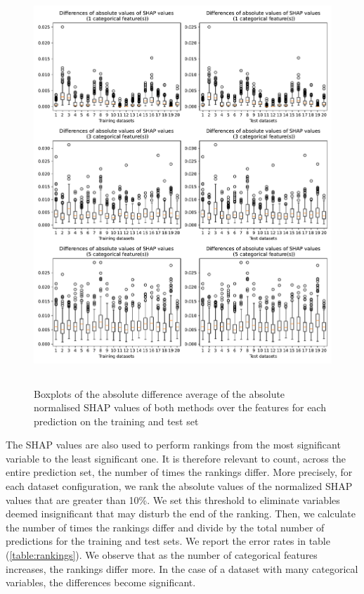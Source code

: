 \documentclass[11pt]{article}
\begin{document}
\begin{figure}[H]
    \centering
    \includegraphics[height=15cm]{"../outputs/comparison-shap/figures/boxplots.pdf"}
    \caption{Boxplots of the absolute difference average of the absolute normalised SHAP values of both methods over
    the features for each prediction on the training and test set}
    \label{fig:boxplot}
\end{figure}

The SHAP values are also used to perform rankings from the most significant variable to the least significant one. 
It is therefore relevant to count, across the entire prediction set, the number of times the rankings differ.
More precisely, for each dataset configuration, we rank the absolute values of the normalized SHAP values 
that are greater than 10\%. We set this threshold to eliminate variables deemed insignificant that may 
disturb the end of the ranking. Then, we calculate the number of times the rankings differ and divide by the 
total number of predictions for the training and test sets.
We report the error rates in table (\ref{table:rankings}). We observe that as the number of categorical 
features increases, the rankings differ more. In the case of a dataset with many categorical variables, 
the differences become significant.
\end{document}
